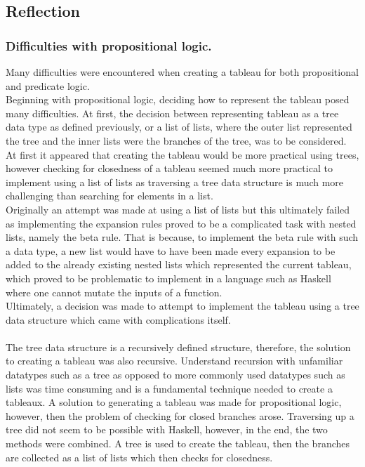 \documentclass{article}%
\begin{document}
\subsection{Reflection}
\subsubsection{Difficulties with propositional logic.} 
Many difficulties were encountered when creating a tableau for both propositional and predicate logic. \\ 
Beginning with propositional logic, deciding how to represent the tableau posed many difficulties. At first, the decision between representing tableau as a tree data type as defined previously, or a list of lists, where the outer list represented the tree and the inner lists were the branches of the tree,  was to be considered. At first it appeared that creating the tableau would be more practical using trees, however checking for closedness of a tableau seemed much more practical to implement using a list of lists as traversing a tree data structure is much more challenging than searching for elements in a list. \\
Originally an attempt was made at using a list of lists but this ultimately failed as implementing the expansion rules proved to be a complicated task with nested lists, namely the beta rule. That is because, to implement the beta rule with such a data type, a new list would have to have been made every expansion to be added to the already existing nested lists which represented the current tableau, which proved to be problematic to implement in a language such as Haskell where one cannot mutate the inputs of a function. \\ 
Ultimately, a decision was made to attempt to implement the tableau using a tree data structure which came with complications itself. \\\\
The tree data structure is a recursively defined structure, therefore, the solution to creating a tableau was also recursive. Understand recursion with unfamiliar datatypes such as a tree as opposed to more commonly used datatypes such as lists was time consuming and is a fundamental technique needed to create a tableaux. A solution to generating a tableau was made for propositional logic, however, then the problem of checking for closed branches arose. Traversing up a tree did not seem to be possible with Haskell, however, in the end, the two methods were combined. A tree is used to create the tableau, then the branches are collected as a list of lists which then checks for closedness. 
\end{document}
